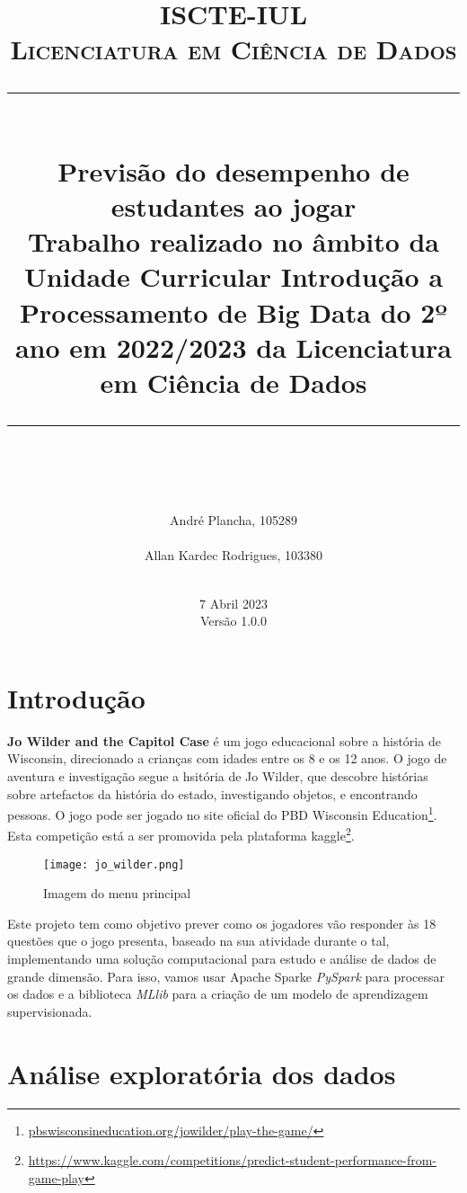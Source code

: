 \documentclass[justified, 11pt]{scrartcl}
\title{	
	\normalfont\normalsize
	\textsc{ISCTE-IUL \\ Licenciatura em Ciência de Dados}\\
	\vspace{20pt} 
	\rule{\linewidth}{0.5pt}\\
	\vspace{20pt}
	{\huge Previsão do desempenho de estudantes ao jogar}\\ 
  \vspace{16pt} 
  {\large Trabalho realizado no âmbito da Unidade Curricular Introdução a Processamento de Big Data do 2º ano em 2022/2023 da Licenciatura em Ciência de Dados}\\
	\vspace{12pt}
	\rule{\linewidth}{2pt}\\
	\vspace{20pt} 
}
\author{
  André Plancha, 105289 \\
  \email{Andre\_Plancha@iscte-iul.pt}\\
  Allan Kardec Rodrigues, 103380 \\
  \email{aksrs@iscte-iul.pt} \\
  \vspace{30pt}
}
\date{7 Abril 2023 \\ Versão 1.0.0}
\begin{document}
  \thispagestyle{empty}
  \maketitle
  \pagebreak
  \section{Introdução}
  \textbf{Jo Wilder and the Capitol Case} é um jogo educacional sobre a história de Wisconsin, direcionado a crianças com idades entre os 8 e os 12 anos. O jogo de aventura e investigação segue a hsitória de Jo Wilder, que descobre histórias sobre artefactos da história do estado, investigando objetos, e encontrando pessoas. O jogo pode ser jogado no site oficial do PBD Wisconsin Education\footnote{\url{pbswisconsineducation.org/jowilder/play-the-game/}}. Esta competição está a ser promovida pela plataforma kaggle\footnote{\url{https://www.kaggle.com/competitions/predict-student-performance-from-game-play}}.

  \begin{figure}[h]
    \centering
    \texttt{[image: jo\_wilder.png]}
    \caption{Imagem do menu principal}
    \label{fig:jo_wilder}
  \end{figure}

  Este projeto tem como objetivo prever como os jogadores vão responder às 18 questões que o jogo presenta, baseado na sua atividade durante o tal, implementando uma solução computacional para estudo e análise de dados de grande dimensão. Para isso, vamos usar Apache Spark\texttrademark e \textit{PySpark} para processar os dados e a biblioteca \textit{MLlib} para a criação de um modelo de aprendizagem supervisionada.

  \section{Análise exploratória dos dados}
  
\end{document}
